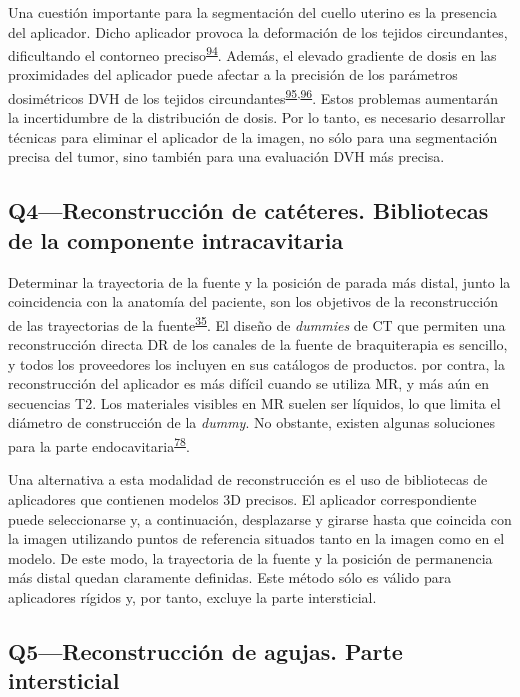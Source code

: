 \documentclass[
  a4paper,
]{scrreprt}
\begin{document}
Una cuestión importante para la segmentación del cuello uterino es la
presencia del aplicador. Dicho aplicador provoca la deformación de los
tejidos circundantes, dificultando el contorneo
preciso\textsuperscript{\protect\hyperlink{ref-sabater2014}{94}}.
Además, el elevado gradiente de dosis en las proximidades del aplicador
puede afectar a la precisión de los parámetros dosimétricos DVH de los
tejidos
circundantes\textsuperscript{\protect\hyperlink{ref-anderson2013}{95},\protect\hyperlink{ref-xu2022}{96}}.
Estos problemas aumentarán la incertidumbre de la distribución de dosis.
Por lo tanto, es necesario desarrollar técnicas para eliminar el
aplicador de la imagen, no sólo para una segmentación precisa del tumor,
sino también para una evaluación DVH más precisa.

\hypertarget{sec-q4}{%
\subsection{Q4---Reconstrucción de catéteres. Bibliotecas de la
componente intracavitaria}\label{sec-q4}}

Determinar la trayectoria de la fuente y la posición de parada más
distal, junto la coincidencia con la anatomía del paciente, son los
objetivos de la reconstrucción de las trayectorias de la
fuente\textsuperscript{\protect\hyperlink{ref-dimopoulos2012}{35}}. El
diseño de \emph{dummies} de CT que permiten una reconstrucción directa
DR de los canales de la fuente de braquiterapia es sencillo, y todos los
proveedores los incluyen en sus catálogos de productos. por contra, la
reconstrucción del aplicador es más difícil cuando se utiliza MR, y más
aún en secuencias T2. Los materiales visibles en MR suelen ser líquidos,
lo que limita el diámetro de construcción de la \emph{dummy}. No
obstante, existen algunas soluciones para la parte
endocavitaria\textsuperscript{\protect\hyperlink{ref-perez-calatayud2009}{78}}.

Una alternativa a esta modalidad de reconstrucción es el uso de
bibliotecas de aplicadores que contienen modelos 3D precisos. El
aplicador correspondiente puede seleccionarse y, a continuación,
desplazarse y girarse hasta que coincida con la imagen utilizando puntos
de referencia situados tanto en la imagen como en el modelo. De este
modo, la trayectoria de la fuente y la posición de permanencia más
distal quedan claramente definidas. Este método sólo es válido para
aplicadores rígidos y, por tanto, excluye la parte intersticial.

\hypertarget{sec-q5}{%
\subsection{Q5---Reconstrucción de agujas. Parte
intersticial}\label{sec-q5}}
\end{document}
